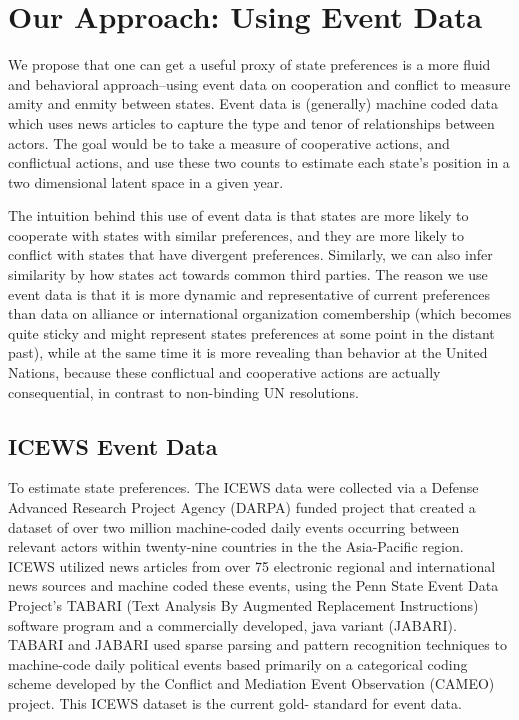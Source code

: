 \documentclass[fignum,letterpaper,12pt]{amsart}
\begin{document}
\section{Our Approach: Using Event Data}
We propose that one can get a useful proxy of state preferences is a more fluid and behavioral approach--using event data on cooperation and conflict to measure amity and enmity between states. Event data is (generally) machine coded data which uses news articles to capture the type and tenor of relationships between actors. The goal would be to take a measure of cooperative actions, and conflictual actions, and use these two counts to estimate each state's position in a two dimensional latent space in a given year. 

The intuition behind this use of event data is that states are more likely to cooperate with states with similar preferences, and they are more likely to conflict with states that have divergent preferences. Similarly, we can also infer similarity by how states act towards common third parties. The reason we use event data is that it is more dynamic and representative of current preferences than data on alliance or international organization comembership (which becomes quite sticky and might represent states preferences at some point in the distant past), while at the same time it is more revealing than behavior at the United Nations, because these conflictual and cooperative actions are actually consequential, in contrast to non-binding UN resolutions.


\subsection{ICEWS Event Data}
To estimate state preferences. The ICEWS data were collected via a Defense Advanced Research Project Agency (DARPA) funded project that created a dataset of over two million machine-coded daily events occurring between relevant actors within twenty-nine countries in the the Asia-Pacific region. ICEWS utilized news articles from over 75 electronic regional and international news sources and machine coded these events, using the Penn State Event Data Project's TABARI (Text Analysis By Augmented Replacement Instructions) software program\citep{schrodt:vanbrackle:2013} and a commercially developed, java variant (JABARI). TABARI and JABARI used sparse parsing and pattern recognition techniques to machine-code daily political events based primarily on a categorical coding scheme developed by the Conflict and Mediation Event Observation (CAMEO) project\citep{gerner:schrodt:yilmaz:2009}. This ICEWS dataset is the current gold- standard for event data\citep[p.4]{dorazio:etal:2011}.
\end{document}
